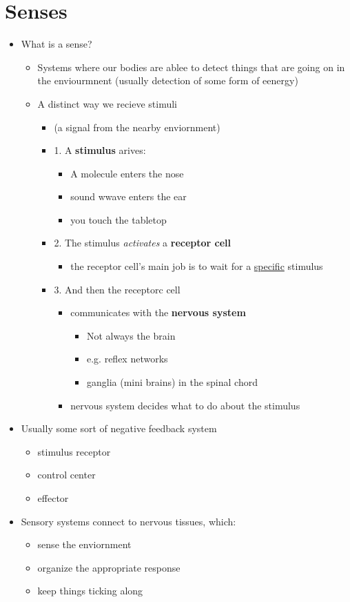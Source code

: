 \documentclass{article}
\theoremstyle{definition}
\begin{document}
\section{Senses}
\begin{itemize}
	\item  What is a sense?
		\begin{itemize}
			\item Systems where our bodies are ablee to detect things that are going on in the enviourmnent (usually detection of some form of eenergy)
			\item A distinct way we recieve stimuli
				\begin{itemize}
					\item (a signal from the nearby enviornment)
					\item 1. A \textbf{stimulus} arives:
						\begin{itemize}
							\item A molecule enters the nose
							\item sound wwave enters the ear
							\item you touch the tabletop
						\end{itemize}
					\item 2. The stimulus \textit{activates} a \textbf{receptor cell} 
						\begin{itemize}
							\item the receptor cell's main job is to wait for a \underline{specific} stimulus
						\end{itemize}
					\item 3. And then the receptorc cell
						\begin{itemize}
							\item communicates with the \textbf{nervous system} 
								\begin{itemize}
									\item Not always the brain
									\item e.g. reflex networks
									\item ganglia (mini brains) in the spinal chord
								\end{itemize}
							\item nervous system decides what to do about the stimulus
						\end{itemize}
				\end{itemize}
		\end{itemize}
	\item Usually some sort of negative feedback system
		\begin{itemize}
			\item stimulus receptor
			\item control center
			\item effector
		\end{itemize}
	\item Sensory systems connect to nervous tissues, which:
		\begin{itemize}
			\item sense the enviornment
			\item organize the appropriate response
			\item keep things ticking along
		\end{itemize}
\end{itemize}
\end{document}
